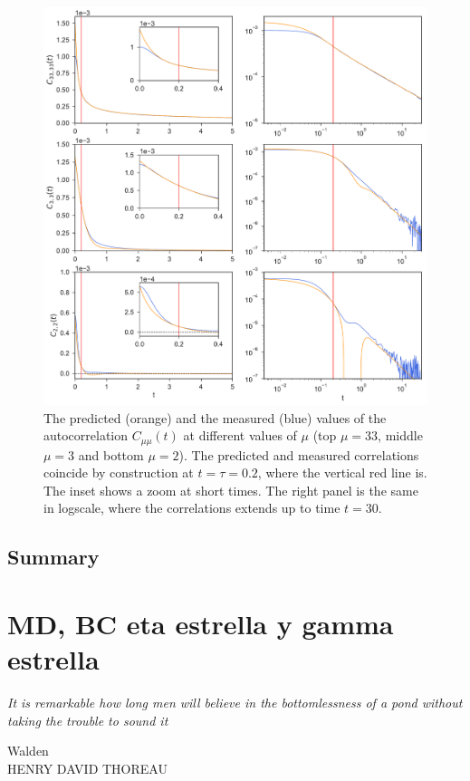 \documentclass[a4paper,openright,12pt]{book}
\begin{document}
\begin{figure}[h!]
  \centering
\includegraphics[scale=0.45]{Predictions-WALLS-66nodes}
\caption[Predicted autocorrelations of $C(t)$ for 66 nodes.]{The predicted (orange) and the measured (blue) values of the autocorrelation $C_{\mu\mu}(t)$ at different values of $\mu$ (top $\mu=33$, middle $\mu=3$ and bottom $\mu=2$). The predicted and measured correlations coincide by construction at $t=\tau=0.2$, where the vertical red line is. The inset shows a zoom at short times. The right panel is the same in logscale, where the correlations extends up to time $t=30$.}
\label{fig:Predictions-WALLS-66nodes}
\end{figure}


\section{Summary}

\chapter{MD, BC eta estrella y gamma estrella}\label{Chap:Coeff}
\epigraph{\textit{It is remarkable how long men will believe in the bottomlessness of a pond without taking the trouble to sound it}}{Walden \\ HENRY DAVID THOREAU}
\end{document}
